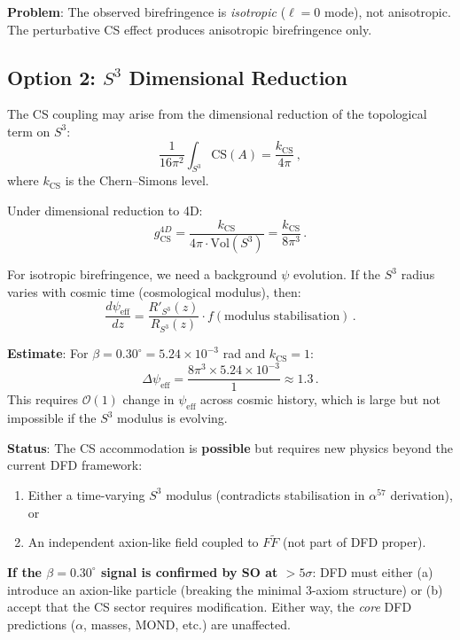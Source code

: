\documentclass[11pt,a4paper]{article}
\begin{document}
\textbf{Problem}: The observed birefringence is \emph{isotropic} ($\ell = 0$ mode), not anisotropic. The perturbative CS effect produces anisotropic birefringence only.

\subsection{Option 2: $S^3$ Dimensional Reduction}

The CS coupling may arise from the dimensional reduction of the topological term on $S^3$:
\begin{equation}
\frac{1}{16\pi^2}\int_{S^3} \mathrm{CS}(A) = \frac{k_{\mathrm{CS}}}{4\pi}\,,
\end{equation}
where $k_{\mathrm{CS}}$ is the Chern--Simons level.

Under dimensional reduction to 4D:
\begin{equation}
g_{\mathrm{CS}}^{4D} = \frac{k_{\mathrm{CS}}}{4\pi \cdot \mathrm{Vol}(S^3)} = \frac{k_{\mathrm{CS}}}{8\pi^3}\,.
\end{equation}

For isotropic birefringence, we need a background $\psi$ evolution. If the $S^3$ radius varies with cosmic time (cosmological modulus), then:
\begin{equation}
\frac{d\psi_{\mathrm{eff}}}{dz} = \frac{R'_{S^3}(z)}{R_{S^3}(z)} \cdot f(\text{modulus stabilisation})\,.
\end{equation}

\textbf{Estimate}: For $\beta = 0.30^\circ = 5.24 \times 10^{-3}$ rad and $k_{\mathrm{CS}} = 1$:
\begin{equation}
\Delta\psi_{\mathrm{eff}} = \frac{8\pi^3 \times 5.24 \times 10^{-3}}{1} \approx 1.3\,.
\end{equation}
This requires $\mathcal{O}(1)$ change in $\psi_{\mathrm{eff}}$ across cosmic history, which is large but not impossible if the $S^3$ modulus is evolving.

\begin{tcolorbox}[colback=yellow!5!white, colframe=yellow!60!black, title={Agent 7 Assessment}]
\textbf{Status}: The CS accommodation is \textbf{possible} but requires new physics beyond the current DFD framework:
\begin{enumerate}
\item Either a time-varying $S^3$ modulus (contradicts stabilisation in $\alpha^{57}$ derivation), or
\item An independent axion-like field coupled to $F\tilde{F}$ (not part of DFD proper).
\end{enumerate}

\textbf{If the $\beta = 0.30^\circ$ signal is confirmed by SO at $>5\sigma$}: DFD must either (a) introduce an axion-like particle (breaking the minimal 3-axiom structure) or (b) accept that the CS sector requires modification. Either way, the \emph{core} DFD predictions ($\alpha$, masses, MOND, etc.) are unaffected.
\end{tcolorbox}
\end{document}
